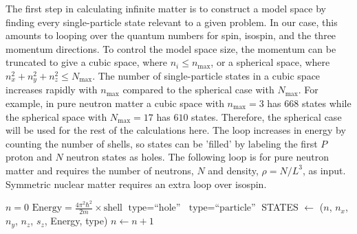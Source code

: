The first step in calculating infinite matter is to construct a model space by finding every single-particle state relevant to a given problem. In our case, this amounts to looping over the quantum numbers for spin, isospin, and the three momentum directions. To control the model space size, the momentum can be truncated to give a cubic space, where $n_{i}\leq n_{\text{max}}$, or a spherical space, where $n_{x}^{2}+n_{y}^{2}+n_{z}^{2}\leq N_{\text{max}}$. The number of single-particle states in a cubic space increases rapidly with $n_{\text{max}}$ compared to the spherical case with $N_{\text{max}}$. For example, in pure neutron matter a cubic space with $n_{\text{max}}=3$ has $668$ states while the spherical space with $N_{\text{max}}=17$ has $610$ states. Therefore, the spherical case will be used for the rest of the calculations here. The loop increases in energy by counting the number of shells, so states can be 'filled' by labeling the first $P$ proton and $N$ neutron states as holes. The following loop is for pure neutron matter and requires the number of neutrons, $N$ and density, $\rho=N/L^{3}$, as input. Symmetric nuclear matter requires an extra loop over isospin.

\begin{algorithmic}
  \State $n=0$
  \State $\text{Energy}=\frac{4\pi^{2}\hbar^{2}}{2m}\times\text{shell}$
  \State $\text{type}=\text{``hole''}$
  \Else
  \State $\text{type}=\text{``particle''}$
  \EndIf
  \State STATES $\gets$ ($n$, $n_{x}$, $n_{y}$, $n_{z}$, $s_{z}$, Energy, type)
  \State $n\gets n+1$
  \EndIf
  \EndFor
  \EndFor
  \EndFor
  \EndFor
  \EndFor
\end{algorithmic}

